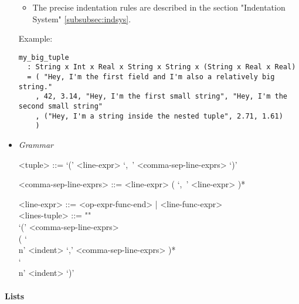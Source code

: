 \documentclass{article}
\begin{document}
\begin{itemize}
\begin{itemize}
\item
The precise indentation rules are described in the section
"Indentation System" \ref{subsubsec:indsys}.
\end{itemize}
Example:
\begin{verbatim}
my_big_tuple
  : String x Int x Real x String x String x (String x Real x Real)
  = ( "Hey, I'm the first field and I'm also a relatively big string."
    , 42, 3.14, "Hey, I'm the first small string", "Hey, I'm the second small string"
    , ("Hey, I'm a string inside the nested tuple", 2.71, 1.61)
    )
\end{verbatim}

\item \textit{Grammar}
\begin{grammar}
<tuple> ::= `(' <line-expr> `,\ ' <comma-sep-line-exprs> `)'

<comma-sep-line-exprs> ::= <line-expr> ( `,\ ' <line-expr> )*

<line-expr> ::= <op-expr-func-end> | <line-func-expr>\\

<lines-tuple> ::= ""\\
`(' <comma-sep-line-exprs> \\
( `\\n' <indent> `,' <comma-sep-line-exprs> )* \\
`\\n' <indent> `)'
\end{grammar}

\end{itemize}

\paragraph{Lists}
\end{document}
